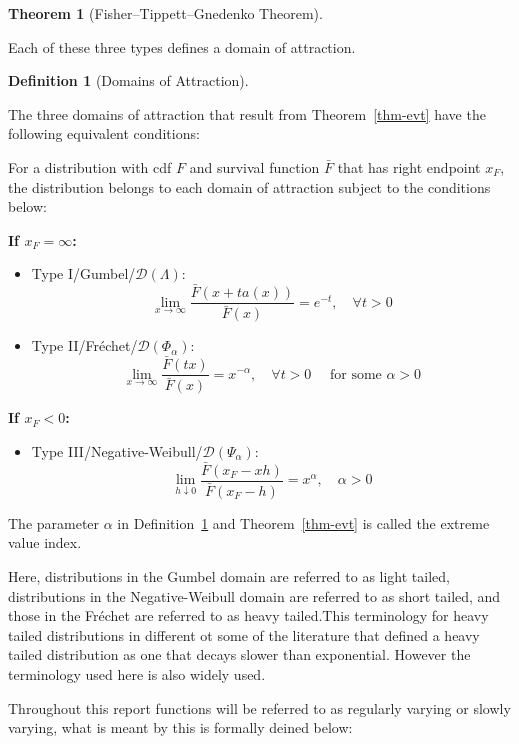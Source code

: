 \documentclass[
  10pt,
  a4paper,
]{scrreprt}
\providecommand{\tightlist}{%
  \setlength{\itemsep}{0pt}\setlength{\parskip}{0pt}}\usepackage{longtable,booktabs,array}
\theoremstyle{definition}
\newtheorem{definition}{Definition}[section]
\theoremstyle{plain}
\newtheorem{theorem}{Theorem}[section]
\theoremstyle{remark}
\begin{document}
{\begin{theorem}[Fisher--Tippett--Gnedenko
Theorem]
\end{theorem}

Each of these three types defines a domain of attraction.

\begin{definition}[Domains of
Attraction]\protect\hypertarget{def-doa}{}\label{def-doa}

The three domains of attraction that result from Theorem~\ref{thm-evt}
have the following equivalent conditions:

For a distribution with cdf \(F\) and survival function \(\bar F\) that
has right endpoint \(x_F\), the distribution belongs to each domain of
attraction subject to the conditions below:

\textbf{If \(x_F=\infty\): }

\begin{itemize}
\tightlist
\item
  Type I/Gumbel/\(\mathcal D(\Lambda)\): \[
  \lim_{x\rightarrow\infty} \displaystyle\frac{\bar F(x+ta(x))}{\bar F(x)} = e^{-t},\quad \forall t>0 
  \]
\item
  Type II/Fréchet/\(\mathcal D (\Phi_\alpha)\): \[
  \lim_{x\rightarrow\infty} \displaystyle\frac{\bar F(tx)}{\bar F(x)} = x^{-\alpha}, \quad \forall t>0 \quad \text{ for some } \alpha>0
  \]
\end{itemize}

\textbf{If \(x_F<0\):}

\begin{itemize}
\tightlist
\item
  Type III/Negative-Weibull/\(\mathcal D(\Psi_\alpha)\): \[
  \lim_{h\downarrow 0}\displaystyle\frac{\bar F(x_F-xh)}{\bar F(x_F-h)} = x^\alpha, \quad\alpha>0
  \]
\end{itemize}

\end{definition}

The parameter \(\alpha\) in Definition~\ref{def-doa} and
Theorem~\ref{thm-evt} is called the extreme value index.

Here, distributions in the Gumbel domain are referred to as light
tailed, distributions in the Negative-Weibull domain are referred to as
short tailed, and those in the Fréchet are referred to as heavy
tailed.This terminology for heavy tailed distributions in different ot
some of the literature that defined a heavy tailed distribution as one
that decays slower than exponential. However the terminology used here
is also widely used.

Throughout this report functions will be referred to as regularly
varying or slowly varying, what is meant by this is formally deined
below:

}
\end{document}
